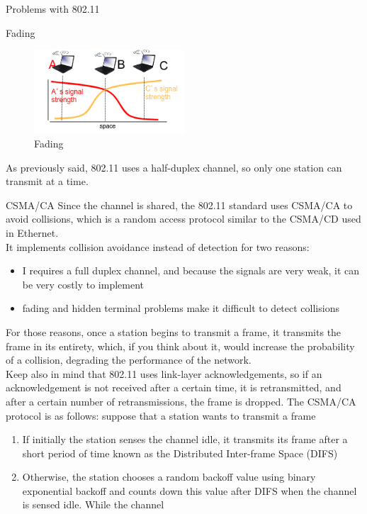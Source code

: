 \begin{section}{Problems with 802.11}
\begin{subsection}{Fading}
\begin{figure}[h]
      \centering
      \includegraphics[width=0.5\textwidth]{img/wireless/fading.png}
      \caption{Fading}
      \label{fig:fading}
    \end{figure}
  \end{subsection}
  As previously said, 802.11 uses a half-duplex channel, so only one station can transmit at a time.
  \begin{subsection}{CSMA/CA}
    \label{sub:CSMA/CA}
    Since the channel is shared, the 802.11 standard uses CSMA/CA to avoid collisions, which is a 
    random access protocol similar to the CSMA/CD used in Ethernet.\\
    It implements collision avoidance instead of detection for two reasons:
    \begin{itemize}
      \item I requires a full duplex channel, and because the signals are very weak, it can be very
        costly to implement
      \item fading and hidden terminal problems make it difficult to detect collisions
    \end{itemize}
    For those reasons, once a station begins to transmit a frame, it transmits the frame in its 
    entirety, which, if you think about it, would increase the probability of a collision, degrading
    the performance of the network.\\
    Keep also in mind that 802.11 uses link-layer acknowledgements, so if an acknowledgement is not
    received after a certain time, it is retransmitted, and after a certain number of retransmissions,
    the frame is dropped.
    The CSMA/CA protocol is as follows: suppose that a station wants to transmit a frame
    \begin{enumerate}
      \item If initially the station senses the channel idle, it transmits its frame after a short 
        period of time known as the Distributed Inter-frame Space (DIFS)
      \item Otherwise, the station chooses a random backoff value using binary exponential backoff 
         and counts down this value after DIFS when the channel is sensed idle. While the channel 

\end{enumerate}
\end{subsection}
\end{section}
